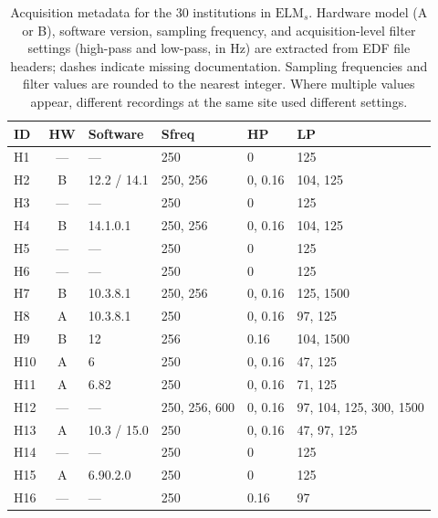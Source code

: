 \documentclass[preprint,12pt]{elsarticle}
\begin{document}
\begin{table}[htbp]
  \centering
  \caption{Acquisition metadata for the 30 institutions in
    $\mathrm{ELM}_s$. Hardware model (A or B), software version,
    sampling frequency, and acquisition-level filter settings
    (high-pass and low-pass, in Hz) are extracted from EDF file
    headers; dashes indicate missing documentation. Sampling
    frequencies and filter values are rounded to the nearest
    integer. Where multiple values appear, different recordings
    at the same site used different settings.}
  \label{tab:acquisition_metadata}
  \small
  \begin{tabular}{lcllll}
    \toprule
    \textbf{ID} & \textbf{HW} &
    \textbf{Software} & \textbf{Sfreq} &
    \textbf{HP} & \textbf{LP} \\
    \midrule
    H1  & ---  & ---                 & 250       & 0          & 125 \\
    H2  & B    & 12.2 / 14.1        & 250, 256  & 0, 0.16   & 104, 125 \\
    H3  & ---  & ---                 & 250       & 0          & 125 \\
    H4  & B    & 14.1.0.1           & 250, 256  & 0, 0.16   & 104, 125 \\
    H5  & ---  & ---                 & 250       & 0          & 125 \\
    H6  & ---  & ---                 & 250       & 0          & 125 \\
    H7  & B    & 10.3.8.1           & 250, 256  & 0, 0.16   & 125, 1500 \\
    H8  & A    & 10.3.8.1           & 250       & 0, 0.16   & 97, 125 \\
    H9  & B    & 12                  & 256       & 0.16       & 104, 1500 \\
    H10 & A    & 6                   & 250       & 0, 0.16   & 47, 125 \\
    H11 & A    & 6.82                & 250       & 0, 0.16   & 71, 125 \\
    H12 & ---  & ---                 & 250, 256, 600 & 0, 0.16 & 97, 104, 125, 300, 1500 \\
    H13 & A    & 10.3 / 15.0        & 250       & 0, 0.16   & 47, 97, 125 \\
    H14 & ---  & ---                 & 250       & 0          & 125 \\
    H15 & A    & 6.90.2.0            & 250       & 0          & 125 \\
    H16 & ---  & ---                 & 250       & 0.16       & 97 \\

\end{tabular}
\end{table}
\end{document}
